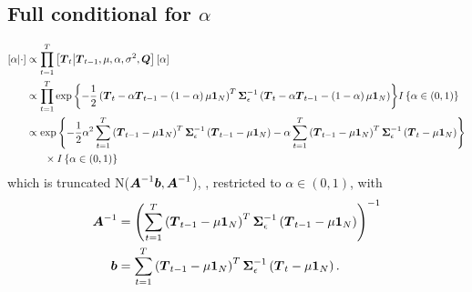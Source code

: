 \documentclass{article}\usepackage[]{graphicx}\usepackage[]{color}
\def\bm#1{\mbox{\boldmath $#1$}}
\begin{document}
\subsection{Full conditional for $\alpha$}
%
\begin{align*}
%
\left[ \alpha \middle| \cdot \right] & \propto \prod_{t = 1}^T \left[ \bm{T}_t \middle| \bm{T}_{t - 1}, \mu, \alpha, \sigma^2, \bm{Q} \right] \left[ \alpha \right]\\
%
& \propto \prod_{t = 1}^T \exp{ \left\{ - \frac{1} {2} \left( \bm{T}_t  - \alpha \bm{T}_{t - 1} - \left( 1 - \alpha \right) \mu \bm{1}_N \right)^T \bm{\Sigma}_\epsilon^{ - 1} \left( \bm{T}_t  - \alpha \bm{T}_{t - 1} - \left( 1 - \alpha \right) \mu \bm{1}_N \right) \right\} } I \left\{ \alpha \in \left( 0, 1 \right) \right\}\\
%
& \propto \exp{ \left\{ - \frac{1} {2} \alpha^2 \sum_{t = 1}^T \left( \bm{T}_{t - 1} - \mu \bm{1}_N \right)^T \bm{\Sigma}_\epsilon^{ - 1} \left( \bm{T}_{t - 1} - \mu \bm{1}_N \right) - \alpha \sum_{t = 1}^T \left( \bm{T}_{t - 1} - \mu \bm{1}_N \right)^T \bm{\Sigma}_\epsilon^{ - 1} \left( \bm{T}_t - \mu \bm{1}_N \right) \right\} } \\
& \hspace{6mm} \times I \left\{ \alpha \in \left( 0, 1 \right) \right\}\\
%
\end{align*}
%
which is truncated N($\bm{A}^{ - 1}\bm{b}, \bm{A}^{ - 1}$), , restricted to $\alpha \in \left( 0, 1 \right)$,  with \\
\begin{align*}
%
\bm{A}^{ - 1} & = \left( \sum_{t = 1}^T \left( \bm{T}_{t - 1} - \mu \bm{1}_N \right)^T \bm{\Sigma}_\epsilon^{ - 1} \left( \bm{T}_{t - 1} - \mu \bm{1}_N \right) \right)^{ - 1}\\
%
\bm{b} & = \sum_{t = 1}^T \left( \bm{T}_{t - 1} - \mu \bm{1}_N \right)^T \bm{\Sigma}_\epsilon^{ - 1} \left( \bm{T}_t - \mu \bm{1}_N \right) .
%
\end{align*}
%
%
\end{document}
